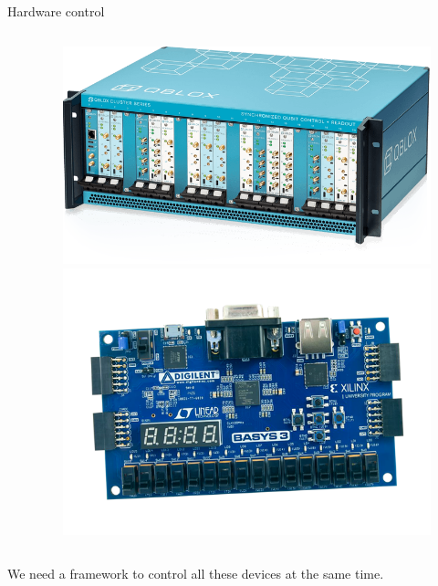 \documentclass[11p,aspectratio=169]{beamer}
\begin{document}
\begin{frame}{Hardware control}
\begin{columns}
\begin{column}{0.5 \textwidth}
        \end{column}
        \begin{column}{0.5 \textwidth}
            \begin{figure}
                \includegraphics[height = 0.3 \textheight]{figures/qblox.png}
                \includegraphics[height = 0.3 \textheight]{figures/fpga.png}
            \end{figure}
            
        \end{column}
    \end{columns}
  
   We need a framework to control all these devices at the same time.
    
\end{frame}
\end{document}
